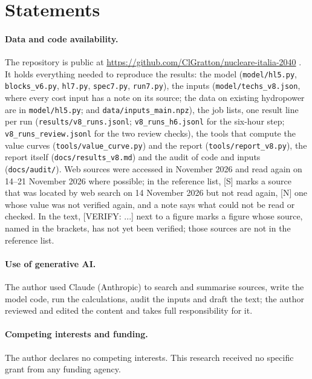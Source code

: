 \documentclass[11pt,a4paper]{article}
\begin{document}
\FloatBarrier

\FloatBarrier

\section*{Statements}
\paragraph{Data and code availability.}\label{sec:data} The repository is public at \url{https://github.com/ClGratton/nucleare-italia-2040} \citep{Repo}. It holds everything needed to reproduce the results: the model (\texttt{model/hl5.py}, \texttt{blocks\_v6.py}, \texttt{hl7.py}, \texttt{spec7.py}, \texttt{run7.py}), the inputs (\texttt{model/techs\_v8.json}, where every cost input has a note on its source; the data on existing hydropower are in \texttt{model/hl5.py}; and \texttt{data/inputs\_main.npz}), the job lists, one result line per run (\texttt{results/v8\_runs.jsonl}; \texttt{v8\_runs\_h6.jsonl} for the six-hour step; \texttt{v8\_runs\_review.jsonl} for the two review checks), the tools that compute the value curves (\nolinkurl{tools/value_curve.py}) and the report (\nolinkurl{tools/report_v8.py}), the report itself (\texttt{docs/results\_v8.md}) and the audit of code and inputs (\texttt{docs/audit/}). Web sources were accessed in November 2026 and read again on 14--21 November 2026 where possible; in the reference list, [S] marks a source that was located by web search on 14 November 2026 but not read again, [N] one whose value was not verified again, and a note says what could not be read or checked. In the text, [VERIFY: ...] next to a figure marks a figure whose source, named in the brackets, has not yet been verified; those sources are not in the reference list.

\paragraph{Use of generative AI.} The author used Claude (Anthropic) to search and summarise sources, write the model code, run the calculations, audit the inputs and draft the text; the author reviewed and edited the content and takes full responsibility for it.

\paragraph{Competing interests and funding.} The author declares no competing interests. This research received no specific grant from any funding agency.



\end{document}
